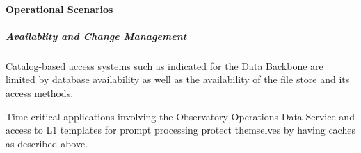 \paragraph{Operational Scenarios}

\subparagraph{Availablity and Change Management}

Catalog-based access systems such as indicated for the Data Backbone are
limited by database availability as well as the availability of the file
store and its access methods.

Time-critical applications involving the Observatory Operations Data
Service and access to L1 templates for prompt processing protect
themselves by having caches as described above.
